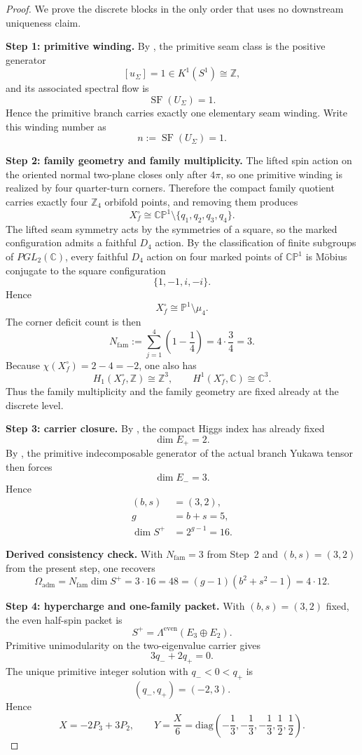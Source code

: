 \documentclass[11pt,a4paper]{article}
\theoremstyle{definition}
\theoremstyle{remark}
\DeclareMathOperator{\SF}{SF}
\newcommand{\Oadm}{\Omega_{\mathrm{adm}}}
\begin{document}
\begin{proof}
We prove the discrete blocks in the only order that uses no downstream uniqueness claim.

\textbf{Step 1: primitive winding.}
By , the primitive seam class is the positive generator
\[
[u_\Sigma]=1\in K^1(S^1)\cong\mathbb Z,
\]
and its associated spectral flow is
\[
\SF(U_\Sigma)=1.
\]
Hence the primitive branch carries exactly one elementary seam winding. Write this winding number as
\[
n:=\SF(U_\Sigma)=1.
\]

\textbf{Step 2: family geometry and family multiplicity.}
The lifted spin action on the oriented normal two-plane closes only after $4\pi$, so one primitive
winding is realized by four quarter-turn corners. Therefore the compact family quotient carries
exactly four $\mathbb Z_4$ orbifold points, and removing them produces
\[
X_f^\circ\cong\mathbb{CP}^1\setminus\{q_1,q_2,q_3,q_4\}.
\]
The lifted seam symmetry acts by the symmetries of a square, so the marked configuration admits a
faithful $D_4$ action. By the classification of finite subgroups of $PGL_2(\mathbb C)$, every
faithful $D_4$ action on four marked points of $\mathbb{CP}^1$ is M\"obius conjugate to the square
configuration
\[
\{1,-1,i,-i\}.
\]
Hence
\[
X_f^\circ\cong\mathbb P^1\setminus\mu_4.
\]
The corner deficit count is then
\[
N_{\mathrm{fam}}
:=
\sum_{j=1}^{4}\left(1-\frac14\right)
=
4\cdot\frac34
=
3.
\]
Because $\chi(X_f^\circ)=2-4=-2$, one also has
\[
H_1(X_f^\circ,\mathbb Z)\cong\mathbb Z^3,
\qquad
H^1(X_f^\circ,\mathbb C)\cong\mathbb C^3.
\]
Thus the family multiplicity and the family geometry are fixed already at the discrete level.

\textbf{Step 3: carrier closure.}
By , the compact Higgs index has already fixed
\[
\dim E_+=2.
\]
By , the primitive indecomposable generator of the actual branch Yukawa tensor
then forces
\[
\dim E_-=3.
\]
Hence
\[
\begin{aligned}
(b,s)&=(3,2),\\
g&=b+s=5,\\
\dim S^+&=2^{g-1}=16.
\end{aligned}
\]

\textbf{Derived consistency check.}
With $N_{\mathrm{fam}}=3$ from Step~2 and $(b,s)=(3,2)$ from the present step, one recovers
\[
\Oadm
=
N_{\mathrm{fam}}\dim S^+
=
3\cdot 16
=
48
=
(g-1)(b^2+s^2-1)
=
4\cdot 12.
\]

\textbf{Step 4: hypercharge and one-family packet.}
With $(b,s)=(3,2)$ fixed, the even half-spin packet is
\[
S^+=\Lambda^{\mathrm{even}}(E_3\oplus E_2).
\]
Primitive unimodularity on the two-eigenvalue carrier gives
\[
3q_-+2q_+=0.
\]
The unique primitive integer solution with $q_-<0<q_+$ is
\[
(q_-,q_+)=(-2,3).
\]
Hence
\[
X=-2P_3+3P_2,
\qquad
Y=\frac{X}{6}
=
\mathrm{diag}\!\left(-\frac13,-\frac13,-\frac13,\frac12,\frac12\right).
\]


\end{proof}
\end{document}
